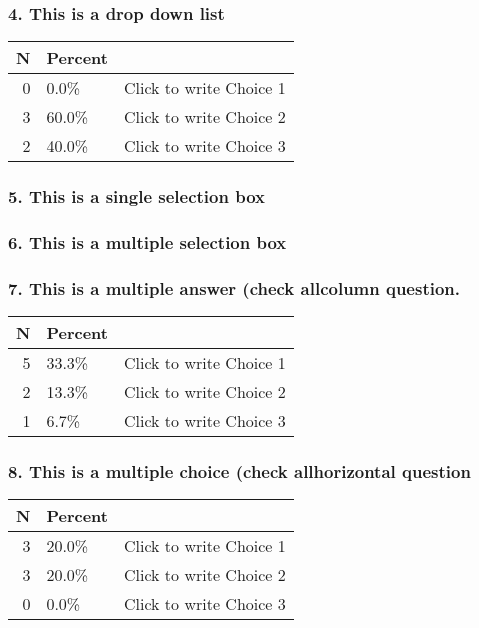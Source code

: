 \documentclass{article}\usepackage[]{graphicx}\usepackage[]{color}
\begin{document}
\hfill \break \hfill \break
\subsubsection*{4.
This is a drop down list}

\begin{tabular}{r|l|l}
\hline
N & Percent & \\
\hline
0 & 0.0\% & Click to write Choice 1\\
\hline
3 & 60.0\% & Click to write Choice 2\\
\hline
2 & 40.0\% & Click to write Choice 3\\
\hline
\end{tabular}


\hfill \break \hfill \break
\subsubsection*{5.
This is a single selection box}

\hfill \break \hfill \break
\subsubsection*{6.
This is a multiple selection box}

\hfill \break \hfill \break
\subsubsection*{7.
This is a multiple answer (check allcolumn question.}

\begin{tabular}{r|l|l}
\hline
N & Percent & \\
\hline
5 & 33.3\% & Click to write Choice 1\\
\hline
2 & 13.3\% & Click to write Choice 2\\
\hline
1 & 6.7\% & Click to write Choice 3\\
\hline
\end{tabular}


\hfill \break \hfill \break
\subsubsection*{8.
This is a multiple choice (check allhorizontal question}

\begin{tabular}{r|l|l}
\hline
N & Percent & \\
\hline
3 & 20.0\% & Click to write Choice 1\\
\hline
3 & 20.0\% & Click to write Choice 2\\
\hline
0 & 0.0\% & Click to write Choice 3\\
\hline
\end{tabular}
\end{document}
